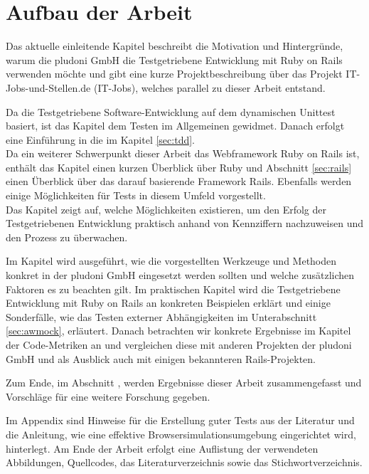 \section{Aufbau der Arbeit}

Das aktuelle einleitende Kapitel beschreibt die Motivation und Hintergründe, warum die pludoni GmbH die Testgetriebene Entwicklung mit Ruby on Rails verwenden möchte und gibt eine kurze Projektbeschreibung über das Projekt IT-Jobs-und-Stellen.de (IT-Jobs), welches parallel zu dieser Arbeit entstand.

Da die Testgetriebene Software-Entwicklung auf dem dynamischen Unittest basiert, ist das Kapitel  dem Testen im Allgemeinen gewidmet. Danach erfolgt eine Einführung in die \textit{} im Kapitel \ref{sec:tdd}. \\
Da ein weiterer Schwerpunkt dieser Arbeit das Webframework Ruby on Rails ist, enthält das Kapitel  einen kurzen Überblick über Ruby und Abschnitt \ref{sec:rails} einen Überblick über das darauf basierende Framework Rails. Ebenfalls werden einige Möglichkeiten für Tests in diesem Umfeld vorgestellt.\\
Das Kapitel  zeigt auf, welche Möglichkeiten existieren, um den Erfolg der Testgetriebenen Entwicklung praktisch anhand von Kennziffern nachzuweisen und den Prozess zu überwachen.

Im Kapitel  wird ausgeführt, wie die vorgestellten Werkzeuge und Methoden konkret in der pludoni GmbH eingesetzt werden sollten und welche zusätzlichen Faktoren es zu beachten gilt.
Im praktischen Kapitel  wird die Testgetriebene Entwicklung mit Ruby on Rails an konkreten Beispielen erklärt und einige Sonderfälle, wie das Testen externer Abhängigkeiten im Unterabschnitt \ref{sec:awmock}, erläutert.
Danach betrachten wir konkrete Ergebnisse im Kapitel  der Code-Metriken an und vergleichen diese mit anderen Projekten der pludoni GmbH und als Ausblick auch mit einigen bekannteren Rails-Projekten.

Zum Ende, im Abschnitt , werden Ergebnisse dieser Arbeit zusammengefasst und Vorschläge für eine weitere Forschung gegeben.

Im Appendix sind Hinweise für die Erstellung guter Tests aus der Literatur und die Anleitung, wie eine effektive Browsersimulationsumgebung eingerichtet wird, hinterlegt. Am Ende der Arbeit erfolgt eine Auflistung der verwendeten Abbildungen, Quellcodes,  das Literaturverzeichnis sowie das Stichwortverzeichnis.

